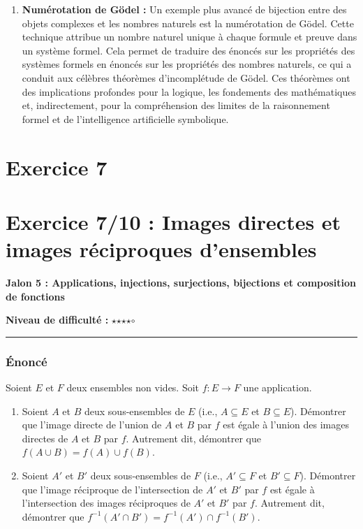 \documentclass[12pt,a4paper]{report}
\begin{document}
\begin{enumerate}
  garantir une distribution uniforme et des recherches rapides, ce qui
  est vital pour la performance des algorithmes d'apprentissage
  automatique et des bases de données utilisées par l'IA.
\item
  \textbf{Numérotation de Gödel :} Un exemple plus avancé de bijection
  entre des objets complexes et les nombres naturels est la numérotation
  de Gödel. Cette technique attribue un nombre naturel unique à chaque
  formule et preuve dans un système formel. Cela permet de traduire des
  énoncés sur les propriétés des systèmes formels en énoncés sur les
  propriétés des nombres naturels, ce qui a conduit aux célèbres
  théorèmes d'incomplétude de Gödel. Ces théorèmes ont des implications
  profondes pour la logique, les fondements des mathématiques et,
  indirectement, pour la compréhension des limites de la raisonnement
  formel et de l'intelligence artificielle symbolique.
\end{enumerate}
\newpage
\section{Exercice 7}
\section{Exercice 7/10 : Images directes et images réciproques
d'ensembles}\label{exercice-710-images-directes-et-images-ruxe9ciproques-densembles}

\textbf{Jalon 5 : Applications, injections, surjections, bijections et
composition de fonctions}

\textbf{Niveau de difficulté :} \(\star\)\(\star\)\(\star\)\(\star\)$\circ$

\begin{center}\rule{0.5\linewidth}{0.5pt}\end{center}

\subsubsection{Énoncé}\label{uxe9noncuxe9}

Soient \(E\) et \(F\) deux ensembles non vides. Soit \(f: E \to F\) une
application.

\begin{enumerate}
\def\labelenumi{\arabic{enumi}.}
\item
  Soient \(A\) et \(B\) deux sous-ensembles de \(E\) (i.e.,
  \(A \subseteq E\) et \(B \subseteq E\)). Démontrer que l'image directe
  de l'union de \(A\) et \(B\) par \(f\) est égale à l'union des images
  directes de \(A\) et \(B\) par \(f\). Autrement dit, démontrer que
  \(f(A \cup B) = f(A) \cup f(B)\).
\item
  Soient \(A'\) et \(B'\) deux sous-ensembles de \(F\) (i.e.,
  \(A' \subseteq F\) et \(B' \subseteq F\)). Démontrer que l'image
  réciproque de l'intersection de \(A'\) et \(B'\) par \(f\) est égale à
  l'intersection des images réciproques de \(A'\) et \(B'\) par \(f\).
  Autrement dit, démontrer que
  \(f^{-1}(A' \cap B') = f^{-1}(A') \cap f^{-1}(B')\).
\end{enumerate}
\end{document}
